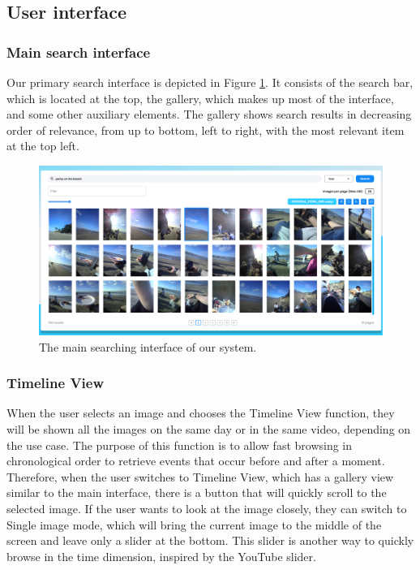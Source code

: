 \subsection{User interface}

\subsubsection{Main search interface}

Our primary search interface is depicted in Figure \ref{fig:FIRST_mainpage}. It consists of the search bar, which is located at the top, the gallery, which makes up most of the interface, and some other auxiliary elements. The gallery shows search results in decreasing order of relevance, from up to bottom, left to right, with the most relevant item at the top left.

\begin{figure}[h]
    \centering
    \includegraphics[width=\textwidth]{content/resources/images/methods/FIRST_mainpage.png}
    \caption{The main searching interface of our system.}
    \label{fig:FIRST_mainpage}
\end{figure}

\subsubsection{Timeline View}
\label{sec:timeline_view}

When the user selects an image and chooses the Timeline View function, they will be shown all the images on the same day or in the same video, depending on the use case. The purpose of this function is to allow fast browsing in chronological order to retrieve events that occur before and after a moment. Therefore, when the user switches to Timeline View, which has a gallery view similar to the main interface, there is a button that will quickly scroll to the selected image. If the user wants to look at the image closely, they can switch to Single image mode, which will bring the current image to the middle of the screen and leave only a slider at the bottom. This slider is another way to quickly browse in the time dimension, inspired by the YouTube slider.

